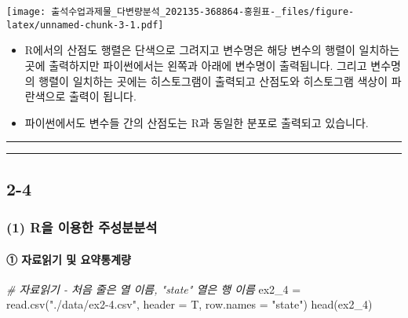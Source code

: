 \documentclass[
]{article}
\newenvironment{Shaded}{\begin{snugshade}}{\end{snugshade}}
\newcommand{\AttributeTok}[1]{\textcolor[rgb]{0.77,0.63,0.00}{#1}}
\newcommand{\CommentTok}[1]{\textcolor[rgb]{0.56,0.35,0.01}{\textit{#1}}}
\newcommand{\FunctionTok}[1]{\textcolor[rgb]{0.00,0.00,0.00}{#1}}
\newcommand{\NormalTok}[1]{#1}
\newcommand{\OtherTok}[1]{\textcolor[rgb]{0.56,0.35,0.01}{#1}}
\newcommand{\StringTok}[1]{\textcolor[rgb]{0.31,0.60,0.02}{#1}}
\providecommand{\tightlist}{%
  \setlength{\itemsep}{0pt}\setlength{\parskip}{0pt}}
\begin{document}
\texttt{[image: 출석수업과제물\_다변량분석\_202135-368864-홍원표-\_files/figure-latex/unnamed-chunk-3-1.pdf]}

\begin{itemize}
\tightlist
\item
  R에서의 산점도 행렬은 단색으로 그려지고 변수명은 해당 변수의 행렬이
  일치하는 곳에 출력하지만 파이썬에서는 왼쪽과 아래에 변수명이
  출력됩니다. 그리고 변수명의 행렬이 일치하는 곳에는 히스토그램이
  출력되고 산점도와 히스토그램 색상이 파란색으로 출력이 됩니다.
\item
  파이썬에서도 변수들 간의 산점도는 R과 동일한 분포로 출력되고 있습니다.
\end{itemize}

\begin{center}\rule{0.5\linewidth}{0.5pt}\end{center}

\begin{center}\rule{0.5\linewidth}{0.5pt}\end{center}

\hypertarget{section-4}{%
\subsection{2-4}\label{section-4}}

\hypertarget{ruxc744-uxc774uxc6a9uxd55c-uxc8fcuxc131uxbd84uxbd84uxc11d}{%
\subsubsection{(1) R을 이용한
주성분분석}\label{ruxc744-uxc774uxc6a9uxd55c-uxc8fcuxc131uxbd84uxbd84uxc11d}}

\hypertarget{uxc790uxb8ccuxc77duxae30-uxbc0f-uxc694uxc57duxd1b5uxacc4uxb7c9}{%
\paragraph{① 자료읽기 및
요약통계량}\label{uxc790uxb8ccuxc77duxae30-uxbc0f-uxc694uxc57duxd1b5uxacc4uxb7c9}}

\begin{Shaded}
\begin{Highlighting}[]
\CommentTok{\# 자료읽기 {-} 처음 줄은 열 이름, "state" 열은 행 이름}
\NormalTok{ex2\_4 }\OtherTok{=} \FunctionTok{read.csv}\NormalTok{(}\StringTok{"./data/ex2{-}4.csv"}\NormalTok{, }\AttributeTok{header =}\NormalTok{ T, }\AttributeTok{row.names =} \StringTok{"state"}\NormalTok{)}
\FunctionTok{head}\NormalTok{(ex2\_4)}
\end{Highlighting}
\end{Shaded}
\end{document}
